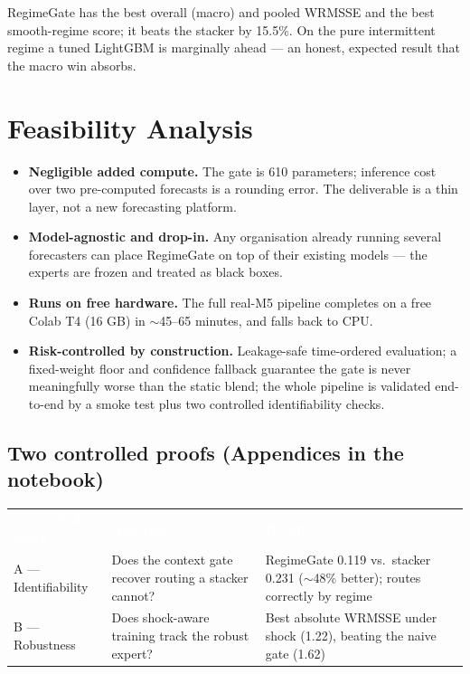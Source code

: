 \documentclass[11pt,a4paper]{article}
\newcommand{\hd}[1]{\textcolor{white}{\textbf{#1}}}
\begin{document}
\vspace{3pt}
{\small RegimeGate has the best overall (macro) and pooled WRMSSE and the best smooth-regime score; it
beats the stacker by 15.5\%. On the pure intermittent regime a tuned LightGBM is marginally ahead ---
an honest, expected result that the macro win absorbs.}

\section{Feasibility Analysis}
\begin{itemize}
  \item \textbf{Negligible added compute.} The gate is 610 parameters; inference cost over two
  pre-computed forecasts is a rounding error. The deliverable is a thin layer, not a new forecasting
  platform.
  \item \textbf{Model-agnostic and drop-in.} Any organisation already running several forecasters can
  place RegimeGate on top of their existing models --- the experts are frozen and treated as black
  boxes.
  \item \textbf{Runs on free hardware.} The full real-M5 pipeline completes on a free Colab T4 (16 GB)
  in $\sim$45--65 minutes, and falls back to CPU.
  \item \textbf{Risk-controlled by construction.} Leakage-safe time-ordered evaluation; a fixed-weight
  floor and confidence fallback guarantee the gate is never meaningfully worse than the static blend;
  the whole pipeline is validated end-to-end by a smoke test plus two controlled identifiability
  checks.
\end{itemize}

\subsection{Two controlled proofs (Appendices in the notebook)}
{\small
\begin{tabular}{>{\raggedright\arraybackslash}p{} >{\raggedright\arraybackslash}p{} >{\raggedright\arraybackslash}p{}}
\rowcolor{ink}\hd{Controlled check} & \hd{Question} & \hd{Result} \\
A --- Identifiability & Does the context gate recover routing a stacker cannot? & RegimeGate 0.119 vs.\ stacker 0.231 ($\sim$48\% better); routes correctly by regime \\
\rowcolor{rowg}B --- Robustness & Does shock-aware training track the robust expert? & Best absolute WRMSSE under shock (1.22), beating the naive gate (1.62) \\
\bottomrule
\end{tabular}}
\end{document}
